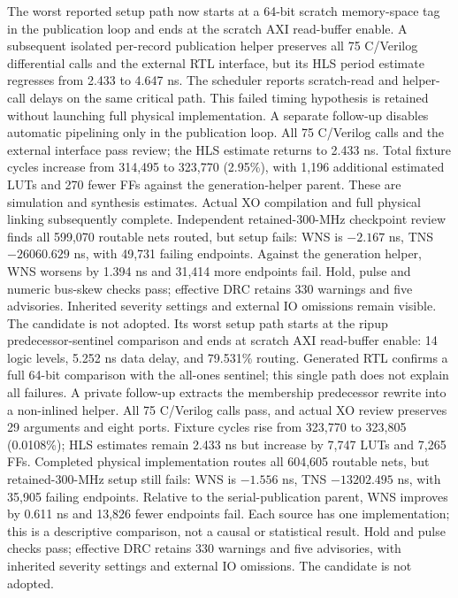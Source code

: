 \documentclass[10pt]{article}
\begin{document}
The worst reported setup path now starts at a 64-bit scratch memory-space
tag in the publication loop and ends at the scratch AXI read-buffer enable.
A subsequent isolated per-record publication helper preserves all 75
C/Verilog differential calls and the external RTL interface, but its HLS
period estimate regresses from 2.433 to 4.647 ns. The scheduler reports
scratch-read and helper-call delays on the same critical path. This failed
timing hypothesis is retained without launching full physical implementation.
A separate follow-up disables automatic pipelining only in the publication
loop. All 75 C/Verilog calls and the external interface pass review; the
HLS estimate returns to 2.433 ns. Total fixture cycles increase from
314,495 to 323,770 (2.95\%), with 1,196 additional estimated LUTs and
270 fewer FFs against the generation-helper parent. These are simulation
and synthesis estimates. Actual XO compilation and full physical linking
subsequently complete. Independent retained-300-MHz checkpoint review finds
all 599,070 routable nets routed, but setup fails: WNS is $-2.167$ ns,
TNS $-26060.629$ ns, with 49,731 failing endpoints. Against the generation
helper, WNS worsens by 1.394 ns and 31,414 more endpoints fail. Hold,
pulse and numeric bus-skew checks pass; effective DRC retains 330 warnings
and five advisories. Inherited severity settings and external IO omissions
remain visible. The candidate is not adopted.
Its worst setup path starts at the ripup predecessor-sentinel comparison
and ends at scratch AXI read-buffer enable: 14 logic levels, 5.252 ns data
delay, and 79.531\% routing. Generated RTL confirms a full 64-bit
comparison with the all-ones sentinel; this single path does not explain
all failures. A private follow-up extracts the membership predecessor
rewrite into a non-inlined helper. All 75 C/Verilog calls pass, and actual
XO review preserves 29 arguments and eight ports. Fixture cycles rise
from 323,770 to 323,805 (0.0108\%); HLS estimates remain 2.433 ns but
increase by 7,747 LUTs and 7,265 FFs. Completed physical implementation
routes all 604,605 routable nets, but retained-300-MHz setup still fails:
WNS is $-1.556$ ns, TNS $-13202.495$ ns, with 35,905 failing endpoints.
Relative to the serial-publication parent, WNS improves by 0.611 ns and
13,826 fewer endpoints fail. Each source has one implementation; this is
a descriptive comparison, not a causal or statistical result. Hold and
pulse checks pass; effective DRC retains 330 warnings and five advisories,
with inherited severity settings and external IO omissions. The candidate
is not adopted.
\end{document}
